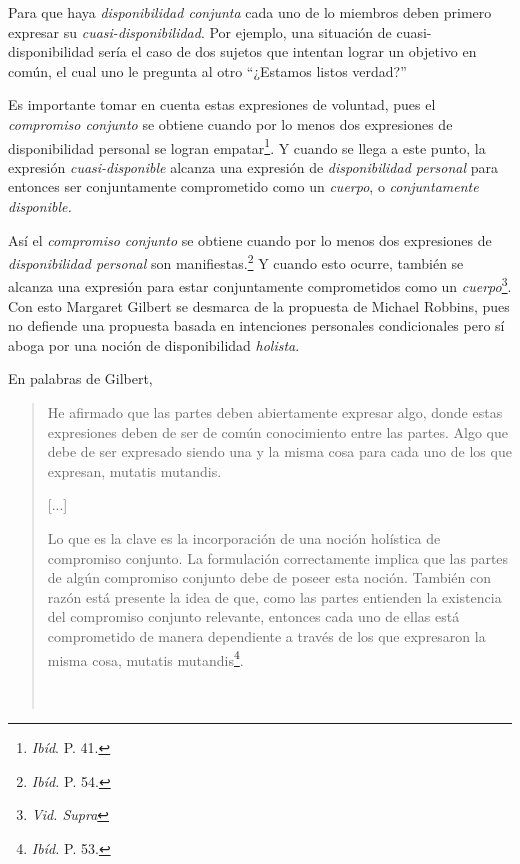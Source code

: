 \documentclass[oneside]{book}
\begin{document}
Para que haya \textit{disponibilidad conjunta} cada uno de lo miembros deben primero expresar su \textit{cuasi-disponibilidad}.	Por ejemplo,  una situación de cuasi-disponibilidad sería el caso de dos sujetos que intentan lograr un objetivo en común, el cual uno le pregunta al otro “¿Estamos listos verdad?”

Es importante tomar en cuenta estas expresiones de voluntad, pues el \textit{compromiso conjunto} se obtiene cuando por lo menos dos expresiones de disponibilidad personal se logran empatar\footnote{\textit{Ibíd}. P. 41.}. Y cuando se llega a este punto, la expresión \textit{cuasi-disponible} alcanza una expresión de \textit{disponibilidad personal} para entonces ser conjuntamente comprometido como un \textit{cuerpo}, o \textit{conjuntamente disponible.}

Así el \textit{compromiso conjunto} se obtiene cuando por lo menos dos expresiones de \textit{disponibilidad personal} son manifiestas.\footnote{\textit{Ibíd.} P. 54.} Y cuando esto ocurre, también se alcanza una expresión para estar conjuntamente comprometidos como un \textit{cuerpo}\footnote{\textit{Vid. Supra}}.
\\

Con esto Margaret Gilbert se desmarca de la propuesta de Michael Robbins, pues no defiende una propuesta basada en intenciones personales condicionales pero sí aboga por una noción de disponibilidad \textit{holista}.

En palabras de Gilbert,

\begin{quotation}
He afirmado que las partes deben abiertamente expresar algo, donde estas expresiones deben de ser de común conocimiento entre las partes. Algo que debe de ser expresado siendo una y la misma cosa para cada uno de los que expresan, mutatis mutandis. 

[...]

Lo que es la clave es la incorporación de una noción holística de compromiso conjunto. La formulación correctamente implica que las partes de algún compromiso conjunto debe de poseer esta noción. También con razón está presente la idea de que, como las partes entienden la existencia del compromiso conjunto relevante, entonces cada uno de ellas está comprometido de manera dependiente a través de los que expresaron la misma cosa, mutatis mutandis\footnote{\textit{Ibíd.} P. 53.}.
\\
\\
\\

\end{quotation}
\end{document}
